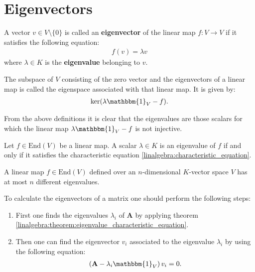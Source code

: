 \section{Eigenvectors}

    \begin{definition}[Eigenvector]
        A vector $v\in V\setminus\{0\}$ is called an \textbf{eigenvector} of the linear map $f:V\rightarrow V$ if it satisfies the following equation:
       \begin{gather}
            f(v) = \lambda v
        \end{gather}
       where $\lambda\in K$ is the \textbf{eigenvalue} belonging to $v$.
    \end{definition}
    \begin{definition}[Eigenspace]
        The subspace of $V$ consisting of the zero vector and the eigenvectors of a linear map is called the eigenspace associated with that linear map. It is given by:
        \begin{gather}
            \text{ker}(\lambda\mathbbm{1}_V - f).
        \end{gather}
    \end{definition}
    \begin{remark}\label{linalgebra:eigenvalue_remark}
        From the above definitions it is clear that the eigenvalues are those scalars for which the linear map $\lambda\mathbbm{1}_V-f$ is not injective.
    \end{remark}

    \begin{theorem}\label{linalgebra:theorem:eigenvalue_characteristic_equation}
        Let $f\in\text{End}(V)$ be a linear map. A scalar $\lambda\in K$ is an eigenvalue of $f$ if and only if it satisfies the characteristic equation \ref{linalgebra:characteristic_equation}.
    \end{theorem}

    \begin{theorem}
        A linear map $f\in\text{End}(V)$ defined over an $n$-dimensional $K$-vector space $V$ has at most $n$ different eigenvalues.
    \end{theorem}

    \begin{method}
        To calculate the eigenvectors of a matrix one should perform the following steps:
        \begin{enumerate}
            \item First one finds the eigenvalues $\lambda_i$ of $\mathbf{A}$ by applying theorem \ref{linalgebra:theorem:eigenvalue_characteristic_equation}.
            \item Then one can find the eigenvector $v_i$ associated to the eigenvalue $\lambda_i$ by using the following equation:
                \begin{gather}
                    \label{linalgebra:eigenvectors:eigenspace}
                    \left(\mathbf{A} - \lambda_i\mathbbm{1}_V\right)v_i = 0.
                \end{gather}
        \end{enumerate}
    \end{method}

